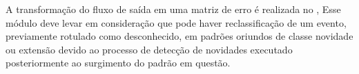
A transformação do fluxo de saída em uma matriz de erro é realizada no \sink,
Esse módulo deve levar em consideração que pode haver reclassificação de um
evento, previamente rotulado como desconhecido, em padrões oriundos de classe
novidade ou extensão devido ao processo de detecção de novidades executado
posteriormente ao surgimento do padrão em questão.






